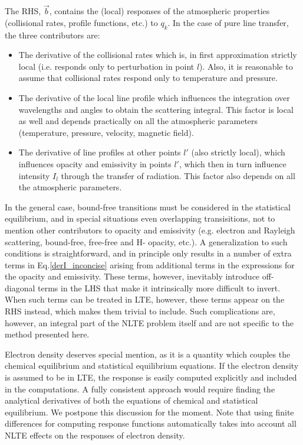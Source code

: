 \documentclass[referee]{aa}
\begin{document}
The RHS, $\vec{b}$, contains the (local) responses of the atmospheric properties (collisional rates, profile functions, etc.) to $q_k$. In the case of pure line transfer, the three contributors are:
\begin{itemize}
 \item The derivative of the collisional rates which is, in first approximation strictly local (i.e. responds only to perturbation in point $l$). Also, it is reasonable to assume that collisional rates respond only to temperature and pressure.
 \item The derivative of the local line profile which influences the integration over wavelengths and angles to obtain the scattering integral. This factor is local as well and depends practically on all the atmospheric parameters (temperature, pressure, velocity, magnetic field).
 \item The derivative of line profiles at other points $l'$ (also strictly local), which influences opacity and emissivity in points $l'$, which then in turn influence intensity $I_l$ through the transfer of radiation. This factor also depends on all the atmospheric parameters.
\end{itemize}
In the general case, bound-free transitions must be considered in the statistical equilibrium, and in special situations even overlapping transisitions, not to mention other contributors to opacity and emissivity (e.g. electron and Rayleigh scattering, bound-free, free-free and H- opacity, etc.). A generalization to such conditions is straightforward, and in principle only results in a number of extra terms in Eq.\ref{derI_inconcise} arising from additional terms in the expressions for the opacity and emissivity. These terms, however, inevitably introduce off-diagonal terms in the LHS that make it intrinsically more difficult to invert. When such terms can be treated in LTE, however, these terms appear on the RHS instead, which makes them trivial to include. Such complications are, however, an integral part of the NLTE problem itself and are not specific to the method presented here.

Electron density deserves special mention, as it is a quantity which couples the chemical equilibrium and statistical equilibrium equations. If the electron density is assumed to be in LTE, the response is easily computed explicitly and included in the computations. A fully consistent approach would require finding the analytical derivatives of both the equations of chemical and statistical equilibrium. We postpone this discussion for the moment. Note that using finite differences for computing response functions automatically takes into account all NLTE effects on the responses of electron density.
\end{document}
